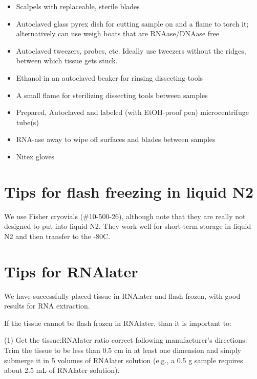 \documentclass[
  letterpaper,
  DIV=11,
  numbers=noendperiod]{scrreprt}
\begin{document}
\begin{itemize}
\item
  Scalpels with replaceable, sterile blades
\item
  Autoclaved glass pyrex dish for cutting sample on and a flame to torch
  it; alternatively can use weigh boats that are RNAase/DNAase free
\item
  Autoclaved tweezers, probes, etc. Ideally use tweezers without the
  ridges, between which tissue gets stuck.
\item
  Ethanol in an autoclaved beaker for rinsing dissecting tools
\item
  A small flame for sterilizing dissecting tools between samples
\item
  Prepared, Autoclaved and labeled (with EtOH-proof pen) microcentrifuge
  tube(s)
\item
  RNA-ase away to wipe off surfaces and blades between samples
\item
  Nitex gloves
\end{itemize}

\hypertarget{tips-for-flash-freezing-in-liquid-n2}{%
\section*{\texorpdfstring{\textbf{Tips for flash freezing in liquid
N2}}{Tips for flash freezing in liquid N2}}\label{tips-for-flash-freezing-in-liquid-n2}}

We use Fisher cryovials (\#10-500-26), although note that they are
really not designed to put into liquid N2. They work well for short-term
storage in liquid N2 and then transfer to the -80C.

\hypertarget{tips-for-rnalater}{%
\section*{\texorpdfstring{\textbf{Tips for
RNAlater}}{Tips for RNAlater}}\label{tips-for-rnalater}}

We have successfully placed tissue in RNAlater and flash frozen, with
good results for RNA extraction.

If the tissue cannot be flash frozen in RNAlater, than it is important
to:

(1) Get the tissue:RNAlater ratio correct following manufacturer's
directions: Trim the tissue to be less than 0.5 cm in at least one
dimension and simply submerge it in 5 volumes of RNAlater solution
(e.g., a 0.5 g sample requires about 2.5 mL of RNAlater solution).
\end{document}
